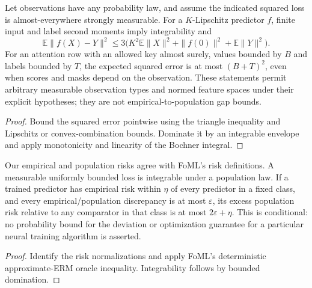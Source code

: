 \begin{lemma}\label{lem:reuse_risk_envelopes}
\leanok
{}
Let observations have any probability law, and assume the indicated squared
loss is almost-everywhere strongly measurable. For a $K$-Lipschitz predictor
$f$, finite input and label second moments imply integrability and
\[
\mathbb E\|f(X)-Y\|^2\leq
3\bigl(K^2\mathbb E\|X\|^2+\|f(0)\|^2+\mathbb E\|Y\|^2\bigr).
\]
For an attention row with an allowed key almost surely, values bounded by $B$
and labels bounded by $T$, the expected squared error is at most $(B+T)^2$,
even when scores and masks depend on the observation. These statements permit
arbitrary measurable observation types and normed feature spaces under their
explicit hypotheses; they are not empirical-to-population gap bounds.
\end{lemma}
\begin{proof}
\leanok
Bound the squared error pointwise using the triangle inequality and Lipschitz
or convex-combination bounds. Dominate it by an integrable envelope and apply
monotonicity and linearity of the Bochner integral.
\end{proof}

\begin{lemma}\label{lem:reuse_erm_bridge}
\leanok
{}
Our empirical and population risks agree with FoML's risk definitions. A
measurable uniformly bounded loss is integrable under a population law.
If a trained predictor has empirical risk within $\eta$ of every predictor
in a fixed class, and every empirical/population discrepancy is at most
$\varepsilon$, its excess population risk relative to any comparator in
that class is at most $2\varepsilon+\eta$.
This is conditional: no probability bound for the deviation or optimization
guarantee for a particular neural training algorithm is asserted.
\end{lemma}
\begin{proof}
\leanok
Identify the risk normalizations and apply FoML's deterministic
approximate-ERM oracle inequality. Integrability follows by bounded domination.
\end{proof}

